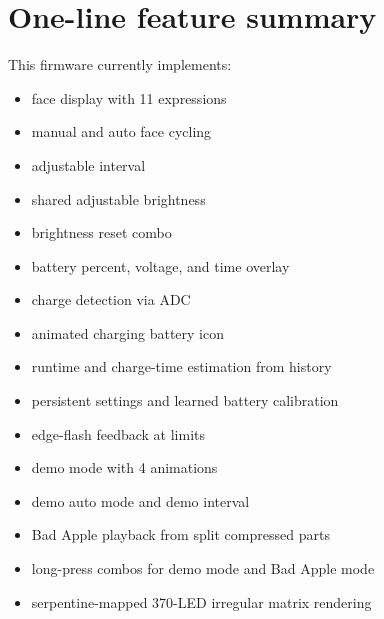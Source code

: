 \documentclass[11pt]{article}
\begin{document}
\section{One-line feature summary}
This firmware currently implements:
\begin{itemize}
  \item face display with 11 expressions
  \item manual and auto face cycling
  \item adjustable interval
  \item shared adjustable brightness
  \item brightness reset combo
  \item battery percent, voltage, and time overlay
  \item charge detection via ADC
  \item animated charging battery icon
  \item runtime and charge-time estimation from history
  \item persistent settings and learned battery calibration
  \item edge-flash feedback at limits
  \item demo mode with 4 animations
  \item demo auto mode and demo interval
  \item Bad Apple playback from split compressed parts
  \item long-press combos for demo mode and Bad Apple mode
  \item serpentine-mapped 370-LED irregular matrix rendering
\end{itemize}
\end{document}
